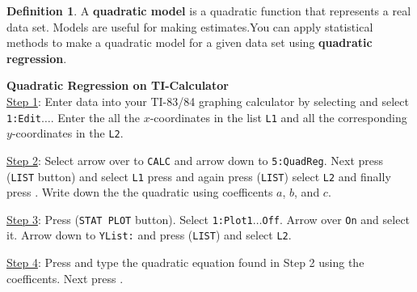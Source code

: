\documentclass{report}
\theoremstyle{definition}
\newtheorem{definition}{\bf Definition}[section]
\begin{document}
\vspace{2.5cm}


\begin{definition}
A \textbf{quadratic model} is a quadratic function that represents a real data set. Models are useful for making estimates.You can apply statistical methods to make a quadratic model for a given data set using \textbf{quadratic regression}.\\
\end{definition}

\large\noindent\textbf{Quadratic Regression on TI-Calculator}\normalsize\\

\vspace{-0.5cm}
\noindent \underline{Step 1}: Enter data into your TI-83/84 graphing calculator by selecting  and select \texttt{1:Edit$\ldots$}. Enter the  all the $x$-coordinates in the list \texttt{L1} and all the corresponding $y$-coordinates in the \texttt{L2}.

\vspace{-0.35cm}
\noindent \underline{Step 2}: Select  arrow over to \texttt{CALC} and arrow down to \texttt{5:QuadReg}. Next press   (\texttt{LIST} button) and select \texttt{L1} press \tcbox[size=small, on line]{,} and again press   (\texttt{LIST}) select \texttt{L2} and finally press . Write down the the quadratic using coefficents $a$, $b$, and $c$.

\vspace{-0.35cm}
\noindent \underline{Step 3}: Press   (\texttt{STAT PLOT} button). Select \texttt{1:Plot1$\ldots$Off}. Arrow over \texttt{On} and select it. Arrow down to \texttt{YList:} and press   (\texttt{LIST}) and select \texttt{L2}. 

\vspace{-0.35cm}
\noindent \underline{Step 4}: Press  and type the quadratic equation found in Step 2 using the coefficents. Next press .

 \newpage
\end{document}
